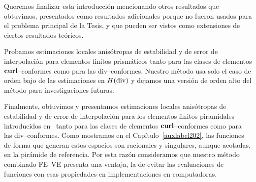 Queremos finalizar esta introducción mencionando otros
resultados que obtuvimos, presentados como resultados
adicionales porque no fueron usados para el problema principal 
de la Tesis, y que pueden ser vistos como extensiones 
de ciertos resultados teóricos.

Probamos estimaciones locales anisótropas 
de estabilidad y de error 
de interpolación para elementos finitos prismáticos
tanto para las clases de elementos 
$\textbf{curl}$--conformes como para las div--conformes.
Nuestro método usa solo el caso de orden bajo de las 
estimaciones en $H(\operatorname{\textrm{div}})$ y dejamos una versión 
de orden alto del método para investigaciones futuras.

Finalmente, obtuvimos y presentamos estimaciones locales anisótropas 
de estabilidad y de error 
de interpolación para los elementos finitos piramidales
introducidos en~\cite{gh99, Nigam-2012} 
tanto para las clases de elementos 
$\textbf{curl}$--conformes como para las div--conformes.
Como mostramos en el Capítulo~\ref{auxlabel202}, las funciones
de forma que generan estos espacios son racionales y singulares,
aunque acotadas, en la pirámide de referencia. Por esta 
razón consideramos que nuestro método combinado FE--VE
presenta una ventaja, la de evitar las evaluaciones de 
funciones con esas propiedades en implementaciones en
computadoras.
